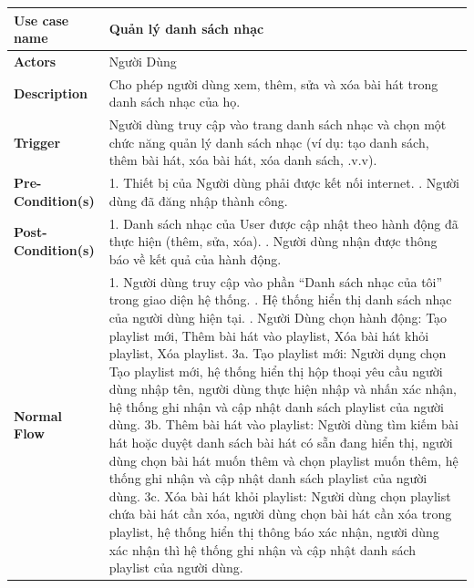 \documentclass[a4paper]{article}
\newcommand{\cach}{\hspace*{1.5em}\ignorespaces}
\begin{document}
\begin{table}[h!]
\centering
\renewcommand{\arraystretch}{1.3} %
\begin{tabularx}{\textwidth}{|l|X|}
\hline
\textbf{Use case name} & Quản lý danh sách nhạc \\ \hline
\textbf{Actors}        & Người Dùng \\ \hline
\textbf{Description}   & Cho phép người dùng xem, thêm, sửa và xóa bài hát trong danh sách nhạc của họ. \\ \hline
\textbf{Trigger}       & Người dùng truy cập vào trang danh sách nhạc và chọn một chức năng quản lý danh sách nhạc (ví dụ: tạo danh sách, thêm bài hát, xóa bài hát, xóa danh sách, .v.v). \\ \hline
\textbf{Pre-Condition(s)} 
& 1. Thiết bị của Người dùng phải được kết nối internet. \newline
  2. Người dùng đã đăng nhập thành công. \\ \hline
\textbf{Post-Condition(s)} 
& 1. Danh sách nhạc của User được cập nhật theo hành động đã thực hiện (thêm, sửa, xóa). \newline
  2. Người dùng nhận được thông báo về kết quả của hành động. \\ \hline
\textbf{Normal Flow}   
& 1. Người dùng truy cập vào phần “Danh sách nhạc của tôi” trong giao diện hệ thống. \newline
  2. Hệ thống hiển thị danh sách nhạc của người dùng hiện tại. \newline
  3. Người Dùng chọn hành động: Tạo playlist mới, Thêm bài hát vào playlist, Xóa bài hát khỏi playlist, Xóa playlist. \newline
  \cach 3a. Tạo playlist mới: Người dụng chọn Tạo playlist mới, hệ thống hiển thị hộp thoại yêu cầu người dùng nhập tên, người dùng thực hiện nhập và nhấn xác nhận, hệ thống ghi nhận và cập nhật danh sách playlist của người dùng. \newline
  \cach 3b. Thêm bài hát vào playlist: Người dùng tìm kiếm bài hát hoặc duyệt danh sách bài hát có sẵn đang hiển thị, người dùng chọn bài hát muốn thêm và chọn playlist muốn thêm, hệ thống ghi nhận và cập nhật danh sách playlist của người dùng. \newline
  \cach 3c. Xóa bài hát khỏi playlist: Người dùng chọn playlist chứa bài hát cần xóa, người dùng chọn bài hát cần xóa trong playlist, hệ thống hiển thị thông báo xác nhận, người dùng xác nhận thì hệ thống ghi nhận và cập nhật danh sách playlist của người dùng. \newline

\end{tabularx}
\end{table}
\end{document}
